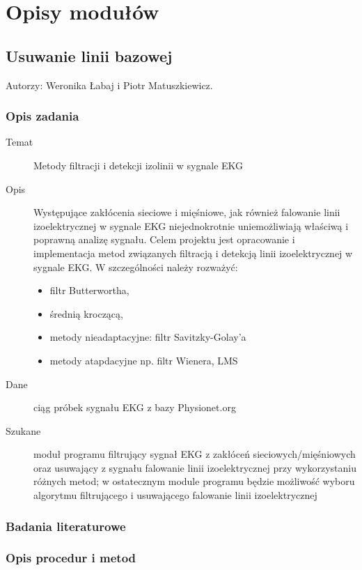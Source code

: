 \documentclass[a4paper, 11pt]{article}
\begin{document}
\section{Opisy modułów}
\label{sec:mod}

\subsection{Usuwanie linii bazowej}
\label{sec:baseline}
Autorzy: Weronika Łabaj i Piotr Matuszkiewicz.

\subsubsection{Opis zadania}
\label{sec:baseline:desc}

\begin{description}
\item[Temat] Metody filtracji i detekcji izolinii w sygnale EKG
\item[Opis] Występujące zakłócenia sieciowe i mięśniowe, jak również falowanie linii izoelektrycznej w sygnale EKG niejednokrotnie uniemożliwiają właściwą i poprawną analizę sygnału. Celem projektu jest opracowanie i implementacja metod związanych filtracją i detekcją linii izoelektrycznej w sygnale EKG. W szczególności należy rozważyć:
  \begin{itemize}
  \item filtr Butterwortha,
  \item średnią kroczącą,
  \item metody nieadaptacyjne: filtr Savitzky-Golay’a
  \item metody atapdacyjne np. filtr Wienera, LMS
  \end{itemize}
\item[Dane] ciąg próbek sygnału EKG z bazy Physionet.org
\item[Szukane] moduł programu filtrujący sygnał EKG z zakłóceń sieciowych/mięśniowych oraz usuwający z sygnału falowanie linii izoelektrycznej przy wykorzystaniu różnych metod; w ostatecznym module programu będzie możliwość wyboru algorytmu filtrującego i usuwającego falowanie linii izoelektrycznej
\end{description}

\subsubsection{Badania literaturowe}
\label{sec:baseline:papers}

\subsubsection{Opis procedur i metod}
\label{sec:baseline:procs}
\end{document}
